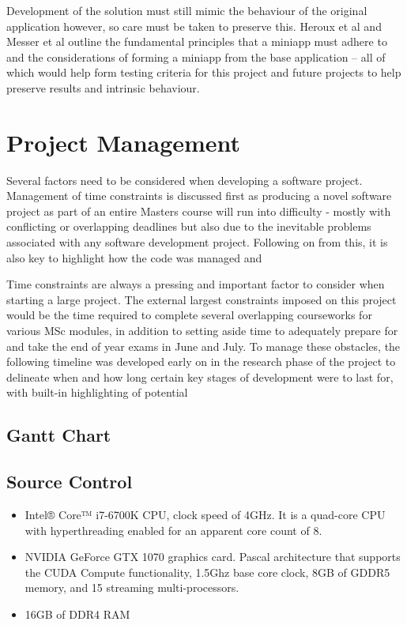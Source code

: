 \documentclass[conference]{IEEEtran}
\begin{document}
Development of the solution must still mimic the behaviour of the original application however, so care must be taken to preserve this. Heroux et al\cite{miniapps} and Messer et al\cite{messer2015developing} outline the fundamental principles that a miniapp must adhere to and the considerations of forming a miniapp from the base application – all of which would help form testing criteria for this project and future projects to help preserve results and intrinsic behaviour.


\section{Project Management}

Several factors need to be considered when developing a software project. Management of time constraints is discussed first as producing a novel software project as part of an entire Masters course will run into difficulty - mostly with conflicting or overlapping deadlines but also due to the inevitable problems associated with any software development project. Following on from this, it is also key to highlight how the code was managed and 

Time constraints are always a pressing and important factor to consider when starting a large project. The external largest constraints imposed on this project would be the time required to complete several overlapping courseworks for various MSc modules, in addition to setting aside time to adequately prepare for and take the end of year exams in June and July. To manage these obstacles, the following timeline was developed early on in the research phase of the project to delineate when and how long certain key stages of development were to last for, with built-in highlighting of potential 

\subsection{Gantt Chart}

\subsection{Source Control}

\begin{itemize}
\item Intel® Core™ i7-6700K CPU, clock speed of 4GHz. It is a quad-core CPU with hyperthreading enabled for an apparent core count of 8.
\item NVIDIA GeForce GTX 1070 graphics card. Pascal architecture that supports the CUDA Compute functionality, 1.5Ghz base core clock, 8GB of GDDR5 memory, and 15 streaming multi-processors.
\item 16GB of DDR4 RAM
\end{itemize}
\end{document}
